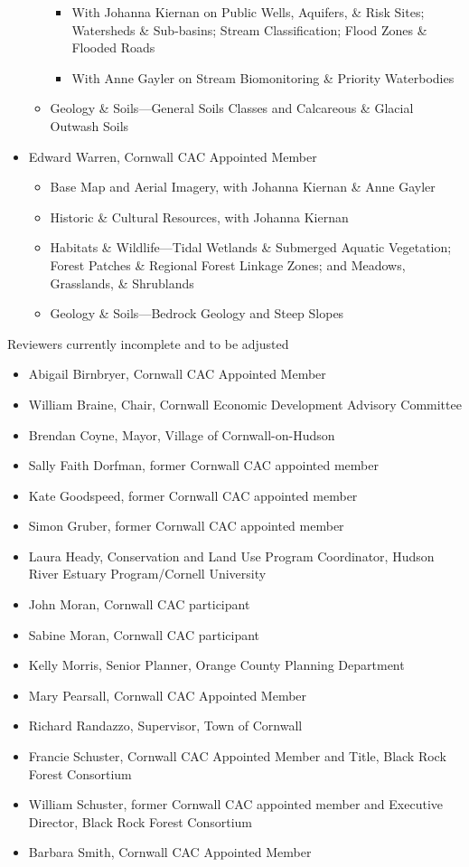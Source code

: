 \begin{itemize}
\begin{itemize}
        \begin{itemize}
            \item With Johanna Kiernan on Public Wells, Aquifers, \& Risk Sites; 
Watersheds \& Sub-basins; Stream Classification; Flood Zones \& Flooded Roads
            \item With Anne Gayler on Stream Biomonitoring \& Priority 
Waterbodies
        \end{itemize}
        \item Geology \& Soils—General Soils Classes and Calcareous \& Glacial 
Outwash Soils
    \end{itemize}
    \item Edward Warren, Cornwall CAC Appointed Member
    \begin{itemize}
        \item Base Map and Aerial Imagery, with Johanna Kiernan \& Anne Gayler
        \item Historic \& Cultural Resources, with Johanna Kiernan
        \item Habitats \& Wildlife—Tidal Wetlands \& Submerged Aquatic 
Vegetation; Forest Patches \& Regional Forest Linkage Zones; and Meadows, 
Grasslands, \& Shrublands
        \item Geology \& Soils—Bedrock Geology and Steep Slopes
    \end{itemize}
\end{itemize}

Reviewers currently incomplete and to be adjusted
\begin{itemize}
    \item Abigail Birnbryer, Cornwall CAC Appointed Member
    \item William Braine, Chair, Cornwall Economic Development Advisory 
Committee
    \item Brendan Coyne, Mayor, Village of Cornwall-on-Hudson
    \item Sally Faith Dorfman, former Cornwall CAC appointed member
    \item Kate Goodspeed, former Cornwall CAC appointed member
    \item Simon Gruber, former Cornwall CAC appointed member
    \item Laura Heady, Conservation and Land Use Program Coordinator, Hudson 
River Estuary Program/Cornell University
    \item John Moran, Cornwall CAC participant
    \item Sabine Moran, Cornwall CAC participant
    \item Kelly Morris, Senior Planner, Orange County Planning Department
    \item Mary Pearsall, Cornwall CAC Appointed Member
    \item Richard Randazzo, Supervisor, Town of Cornwall
    \item Francie Schuster, Cornwall CAC Appointed Member and Title, Black Rock 
Forest Consortium
    \item William Schuster, former Cornwall CAC appointed member and Executive 
Director, Black Rock Forest Consortium
    \item Barbara Smith, Cornwall CAC Appointed Member
\end{itemize}